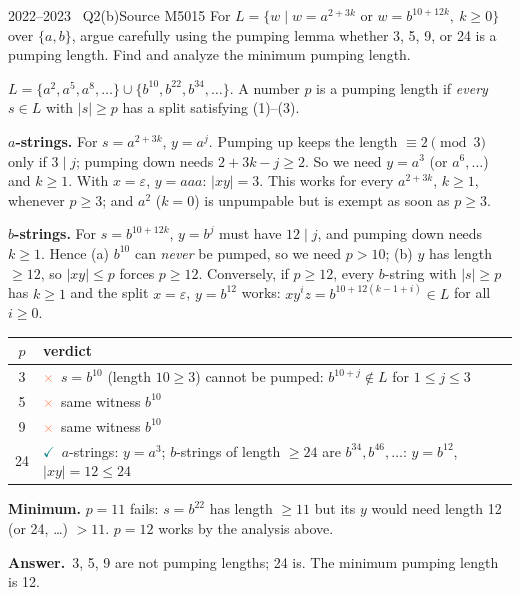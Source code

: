 \documentclass[11pt,a4paper]{article}
\newcommand{\eps}{\varepsilon}
\newcommand{\ok}{\textcolor{teal}{\ensuremath{\checkmark}}}
\newcommand{\no}{\textcolor{coral}{\ensuremath{\times}}}
\newcommand{\ans}[1]{\par\smallskip\noindent\colorbox{mist}{\parbox{\dimexpr\linewidth-2\fboxsep}{\sffamily\small\textbf{\color{teal}Answer.}\ \color{ink}#1}}\par}
\begin{document}
\begin{question}{2022--2023 \textbullet\ Q2(b)}{Source M50}{15}
For $L=\{w\mid w=a^{2+3k}\text{ or }w=b^{10+12k},\ k\ge0\}$ over $\{a,b\}$, argue carefully using the pumping lemma whether 3, 5, 9, or 24 is a pumping length. Find and analyze the minimum pumping length.
\end{question}
\begin{solution}
$L=\{a^2,a^5,a^8,\dots\}\cup\{b^{10},b^{22},b^{34},\dots\}$. A number $p$ is a pumping length if \emph{every} $s\in L$ with $|s|\ge p$ has a split satisfying (1)--(3).

\textbf{$a$-strings.} For $s=a^{2+3k}$, $y=a^j$. Pumping up keeps the length $\equiv2\pmod3$ only if $3\mid j$; pumping down needs $2+3k-j\ge2$. So we need $y=a^{3}$ (or $a^{6},\dots$) and $k\ge1$. With $x=\eps$, $y=aaa$: $|xy|=3$. This works for every $a^{2+3k}$, $k\ge1$, whenever $p\ge3$; and $a^2$ ($k=0$) is unpumpable but is exempt as soon as $p\ge3$.

\textbf{$b$-strings.} For $s=b^{10+12k}$, $y=b^j$ must have $12\mid j$, and pumping down needs $k\ge1$. Hence (a) $b^{10}$ can \emph{never} be pumped, so we need $p>10$; (b) $y$ has length $\ge12$, so $|xy|\le p$ forces $p\ge12$. Conversely, if $p\ge12$, every $b$-string with $|s|\ge p$ has $k\ge1$ and the split $x=\eps$, $y=b^{12}$ works: $xy^iz=b^{10+12(k-1+i)}\in L$ for all $i\ge0$.

\begin{center}\small\begin{tabular}{c|l}\toprule $p$ & verdict\\\midrule
3 & \no\ $s=b^{10}$ (length $10\ge3$) cannot be pumped: $b^{10+j}\notin L$ for $1\le j\le 3$\\
5 & \no\ same witness $b^{10}$\\
9 & \no\ same witness $b^{10}$\\
24 & \ok\ $a$-strings: $y=a^3$; $b$-strings of length $\ge24$ are $b^{34},b^{46},\dots$: $y=b^{12}$, $|xy|=12\le24$\\\bottomrule\end{tabular}\end{center}
\textbf{Minimum.} $p=11$ fails: $s=b^{22}$ has length $\ge11$ but its $y$ would need length 12 (or 24, \dots) $>11$. $p=12$ works by the analysis above.
\ans{3, 5, 9 are not pumping lengths; 24 is. The minimum pumping length is 12.}
\end{solution}
\end{document}
